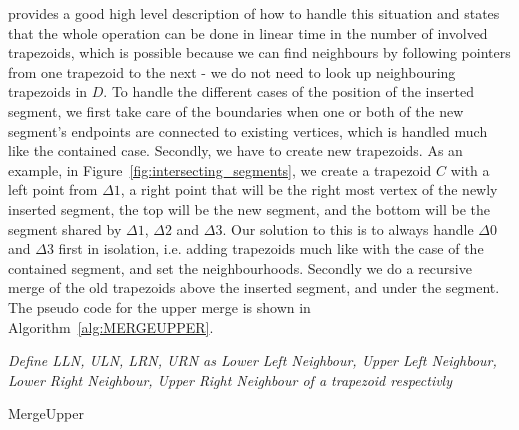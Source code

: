 \cite{computational_geometry} provides a good high level description of how to handle this situation and states that the whole operation can be done in linear time in the number of involved trapezoids, which is possible because we can find neighbours by following pointers from one trapezoid to the next  - we do not need to look up neighbouring trapezoids in $D$. To handle the different cases of the position of the inserted segment, we first take care of the boundaries when one or both of the new segment's endpoints are connected to existing vertices, which is handled much like the contained case. Secondly, we have to create new trapezoids. As an example, in Figure~\ref{fig:intersecting_segments}, we create a  trapezoid $C$ with a left point from $\Delta 1$, a right point that will be the right most vertex of the newly inserted segment, the top will be the new segment, and the bottom will be the segment shared by  $\Delta 1$,  $\Delta 2$ and  $\Delta 3$.  Our solution to this is to always handle $\Delta 0$ and $\Delta 3$ first in isolation, i.e. adding trapezoids much like with the case of the contained segment, and set the neighbourhoods. Secondly we do a recursive merge of the old trapezoids above the inserted segment, and under the segment. The pseudo code for the upper merge is shown in Algorithm~\ref{alg:MERGEUPPER}.


\IncMargin{1em}
\begin{algorithm}[]
\label{alg:MERGEUPPER}
 \emph{Define LLN, ULN, LRN, URN as Lower Left Neighbour, Upper Left Neighbour, Lower Right Neighbour, Upper Right Neighbour of a trapezoid respectivly}\;
\caption{MergeUpper}\label{algo_disjdecomp}
\end{algorithm}\DecMargin{1em}

